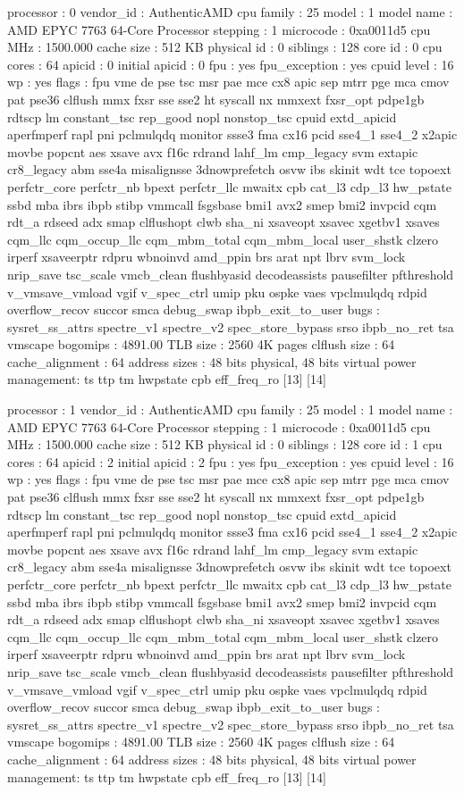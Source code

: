 processor	: 0
vendor_id	: AuthenticAMD
cpu family	: 25
model		: 1
model name	: AMD EPYC 7763 64-Core Processor
stepping	: 1
microcode	: 0xa0011d5
cpu MHz		: 1500.000
cache size	: 512 KB
physical id	: 0
siblings	: 128
core id		: 0
cpu cores	: 64
apicid		: 0
initial apicid	: 0
fpu		: yes
fpu_exception	: yes
cpuid level	: 16
wp		: yes
flags		: fpu vme de pse tsc msr pae mce cx8 apic sep mtrr pge mca cmov pat pse36 clflush mmx fxsr sse sse2 ht syscall nx mmxext fxsr_opt pdpe1gb rdtscp lm constant_tsc rep_good nopl nonstop_tsc cpuid extd_apicid aperfmperf rapl pni pclmulqdq monitor ssse3 fma cx16 pcid sse4_1 sse4_2 x2apic movbe popcnt aes xsave avx f16c rdrand lahf_lm cmp_legacy svm extapic cr8_legacy abm sse4a misalignsse 3dnowprefetch osvw ibs skinit wdt tce topoext perfctr_core perfctr_nb bpext perfctr_llc mwaitx cpb cat_l3 cdp_l3 hw_pstate ssbd mba ibrs ibpb stibp vmmcall fsgsbase bmi1 avx2 smep bmi2 invpcid cqm rdt_a rdseed adx smap clflushopt clwb sha_ni xsaveopt xsavec xgetbv1 xsaves cqm_llc cqm_occup_llc cqm_mbm_total cqm_mbm_local user_shstk clzero irperf xsaveerptr rdpru wbnoinvd amd_ppin brs arat npt lbrv svm_lock nrip_save tsc_scale vmcb_clean flushbyasid decodeassists pausefilter pfthreshold v_vmsave_vmload vgif v_spec_ctrl umip pku ospke vaes vpclmulqdq rdpid overflow_recov succor smca debug_swap ibpb_exit_to_user
bugs		: sysret_ss_attrs spectre_v1 spectre_v2 spec_store_bypass srso ibpb_no_ret tsa vmscape
bogomips	: 4891.00
TLB size	: 2560 4K pages
clflush size	: 64
cache_alignment	: 64
address sizes	: 48 bits physical, 48 bits virtual
power management: ts ttp tm hwpstate cpb eff_freq_ro [13] [14]

processor	: 1
vendor_id	: AuthenticAMD
cpu family	: 25
model		: 1
model name	: AMD EPYC 7763 64-Core Processor
stepping	: 1
microcode	: 0xa0011d5
cpu MHz		: 1500.000
cache size	: 512 KB
physical id	: 0
siblings	: 128
core id		: 1
cpu cores	: 64
apicid		: 2
initial apicid	: 2
fpu		: yes
fpu_exception	: yes
cpuid level	: 16
wp		: yes
flags		: fpu vme de pse tsc msr pae mce cx8 apic sep mtrr pge mca cmov pat pse36 clflush mmx fxsr sse sse2 ht syscall nx mmxext fxsr_opt pdpe1gb rdtscp lm constant_tsc rep_good nopl nonstop_tsc cpuid extd_apicid aperfmperf rapl pni pclmulqdq monitor ssse3 fma cx16 pcid sse4_1 sse4_2 x2apic movbe popcnt aes xsave avx f16c rdrand lahf_lm cmp_legacy svm extapic cr8_legacy abm sse4a misalignsse 3dnowprefetch osvw ibs skinit wdt tce topoext perfctr_core perfctr_nb bpext perfctr_llc mwaitx cpb cat_l3 cdp_l3 hw_pstate ssbd mba ibrs ibpb stibp vmmcall fsgsbase bmi1 avx2 smep bmi2 invpcid cqm rdt_a rdseed adx smap clflushopt clwb sha_ni xsaveopt xsavec xgetbv1 xsaves cqm_llc cqm_occup_llc cqm_mbm_total cqm_mbm_local user_shstk clzero irperf xsaveerptr rdpru wbnoinvd amd_ppin brs arat npt lbrv svm_lock nrip_save tsc_scale vmcb_clean flushbyasid decodeassists pausefilter pfthreshold v_vmsave_vmload vgif v_spec_ctrl umip pku ospke vaes vpclmulqdq rdpid overflow_recov succor smca debug_swap ibpb_exit_to_user
bugs		: sysret_ss_attrs spectre_v1 spectre_v2 spec_store_bypass srso ibpb_no_ret tsa vmscape
bogomips	: 4891.00
TLB size	: 2560 4K pages
clflush size	: 64
cache_alignment	: 64
address sizes	: 48 bits physical, 48 bits virtual
power management: ts ttp tm hwpstate cpb eff_freq_ro [13] [14]

